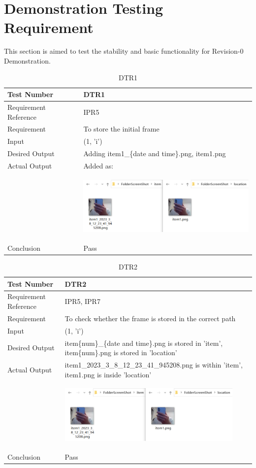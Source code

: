 \documentclass[12pt, titlepage]{article}
\begin{document}
\section{Demonstration Testing Requirement}
This section is aimed to test the stability and basic functionality for Revision-0 Demonstration.
\begin{table}[H]
\begin{center}
\begin{tabular}{|l | m{9cm}|}
\hline
  Test Number & DTR1\\
  \hline
  Requirement Reference & IPR5\\
  \hline
  Requirement &  To store the initial frame\\
  \hline
  Input & (1, 'i')\\
  \hline
  Desired Output & Adding item1\_\{date and time\}.png,  item1.png\\
  \hline
  Actual Output & Added as:\\&\includegraphics[width=90mm, height=35mm]{UT2.png}\\
  \hline
  Conclusion & Pass\\
  \hline
\end{tabular}
\end{center}    
\caption{DTR1}
\end{table}
\begin{table}[H]
\begin{center}
\begin{tabular}{|l | m{9cm}|}
\hline
  Test Number & DTR2\\
  \hline
  Requirement Reference & IPR5, IPR7\\
  \hline
  Requirement &  To check whether the frame is stored in the correct path\\
  \hline
  Input & (1, 'i')\\
  \hline
  Desired Output &  item\{num\}\_\{date and time\}.png is stored in 'item', item\{num\}.png is stored in 'location'\\
  \hline
  Actual Output &  item1\_2023\_3\_8\_12\_23\_41\_945208.png is within 'item', item1.png is inside 'location'\\&\includegraphics[width=90mm, height=35mm]{UT2.png}\\
  \hline
  Conclusion & Pass\\
  \hline
\end{tabular}
\end{center}  
\caption{DTR2}
\end{table}
\end{document}

